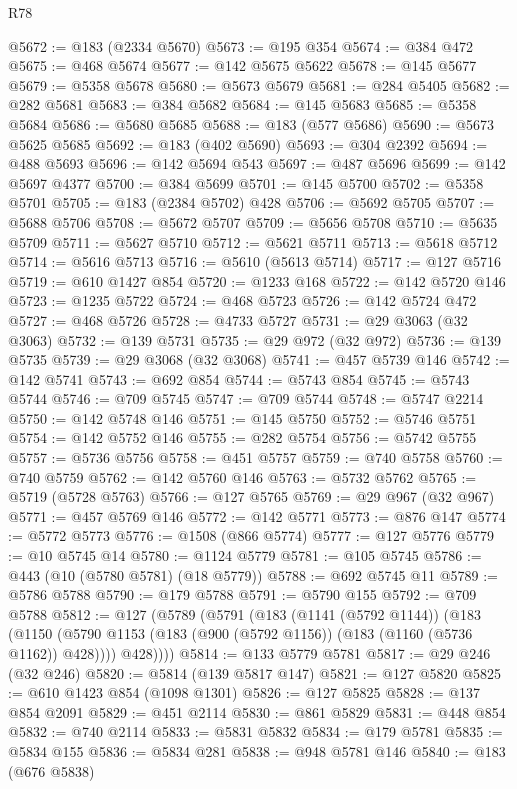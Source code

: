 \begin{lexlean}{R78}
\begin{coremodule}
@5672 := @183 (@2334 @5670)
@5673 := @195 @354
@5674 := @384 @472
@5675 := @468 @5674
@5677 := @142 @5675 @5622
@5678 := @145 @5677
@5679 := @5358 @5678
@5680 := @5673 @5679
@5681 := @284 @5405
@5682 := @282 @5681
@5683 := @384 @5682
@5684 := @145 @5683
@5685 := @5358 @5684
@5686 := @5680 @5685
@5688 := @183 (@577 @5686)
@5690 := @5673 @5625 @5685
@5692 := @183 (@402 @5690)
@5693 := @304 @2392
@5694 := @488 @5693
@5696 := @142 @5694 @543
@5697 := @487 @5696
@5699 := @142 @5697 @4377
@5700 := @384 @5699
@5701 := @145 @5700
@5702 := @5358 @5701
@5705 := @183 (@2384 @5702) @428
@5706 := @5692 @5705
@5707 := @5688 @5706
@5708 := @5672 @5707
@5709 := @5656 @5708
@5710 := @5635 @5709
@5711 := @5627 @5710
@5712 := @5621 @5711
@5713 := @5618 @5712
@5714 := @5616 @5713
@5716 := @5610 (@5613 @5714)
@5717 := @127 @5716
@5719 := @610 @1427 @854
@5720 := @1233 @168
@5722 := @142 @5720 @146
@5723 := @1235 @5722
@5724 := @468 @5723
@5726 := @142 @5724 @472
@5727 := @468 @5726
@5728 := @4733 @5727
@5731 := @29 @3063 (@32 @3063)
@5732 := @139 @5731
@5735 := @29 @972 (@32 @972)
@5736 := @139 @5735
@5739 := @29 @3068 (@32 @3068)
@5741 := @457 @5739 @146
@5742 := @142 @5741
@5743 := @692 @854
@5744 := @5743 @854
@5745 := @5743 @5744
@5746 := @709 @5745
@5747 := @709 @5744
@5748 := @5747 @2214
@5750 := @142 @5748 @146
@5751 := @145 @5750
@5752 := @5746 @5751
@5754 := @142 @5752 @146
@5755 := @282 @5754
@5756 := @5742 @5755
@5757 := @5736 @5756
@5758 := @451 @5757
@5759 := @740 @5758
@5760 := @740 @5759
@5762 := @142 @5760 @146
@5763 := @5732 @5762
@5765 := @5719 (@5728 @5763)
@5766 := @127 @5765
@5769 := @29 @967 (@32 @967)
@5771 := @457 @5769 @146
@5772 := @142 @5771
@5773 := @876 @147
@5774 := @5772 @5773
@5776 := @1508 (@866 @5774)
@5777 := @127 @5776
@5779 := @10 @5745 @14
@5780 := @1124 @5779
@5781 := @105 @5745
@5786 := @443 (@10 (@5780 @5781) (@18 @5779))
@5788 := @692 @5745 @11
@5789 := @5786 @5788
@5790 := @179 @5788
@5791 := @5790 @155
@5792 := @709 @5788
@5812 := @127
    (@5789
      (@5791
        (@183
          (@1141 (@5792 @1144))
          (@183
            (@1150 (@5790 @1153 (@183 (@900 (@5792 @1156)) (@183 (@1160 (@5736 @1162)) @428))))
            @428))))
@5814 := @133 @5779 @5781
@5817 := @29 @246 (@32 @246)
@5820 := @5814 (@139 @5817 @147)
@5821 := @127 @5820
@5825 := @610 @1423 @854 (@1098 @1301)
@5826 := @127 @5825
@5828 := @137 @854 @2091
@5829 := @451 @2114
@5830 := @861 @5829
@5831 := @448 @854
@5832 := @740 @2114
@5833 := @5831 @5832
@5834 := @179 @5781
@5835 := @5834 @155
@5836 := @5834 @281
@5838 := @948 @5781 @146
@5840 := @183 (@676 @5838)

\end{coremodule}
\end{lexlean}
